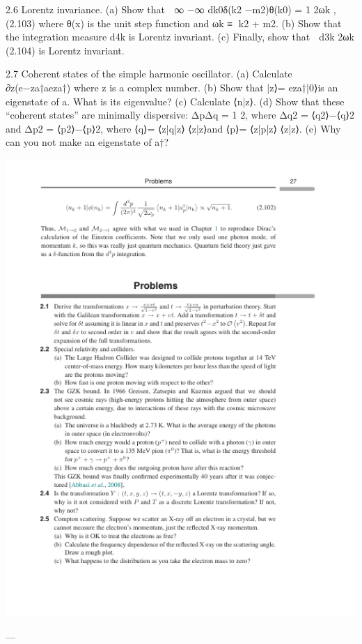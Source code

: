 2.6 Lorentz invariance.
(a) Show that
 ∞
−∞
dk0δ(k2 −m2)θ(k0) =
1
2ωk
,
(2.103)
where θ(x) is the unit step function and ωk ≡
⃗k2 + m2.
(b) Show that the integration measure d4k is Lorentz invariant.
(c) Finally, show that
 d3k
2ωk
(2.104)
is Lorentz invariant.

2.7 Coherent states of the simple harmonic oscillator.
(a) Calculate ∂z(e−za†aeza†) where z is a complex number.
(b) Show that |z⟩= eza†|0⟩is an eigenstate of a. What is its eigenvalue?
(c) Calculate ⟨n|z⟩.
(d) Show that these “coherent states” are minimally dispersive: ΔpΔq = 1
2, where
Δq2 = ⟨q2⟩−⟨q⟩2 and Δp2 = ⟨p2⟩−⟨p⟩2, where ⟨q⟩= ⟨z|q|z⟩
⟨z|z⟩and ⟨p⟩= ⟨z|p|z⟩
⟨z|z⟩.
(e) Why can you not make an eigenstate of a†?

\includegraphics{./figs/2_Lorentz_invariance_and_second_quantization_page_47.png}

---

